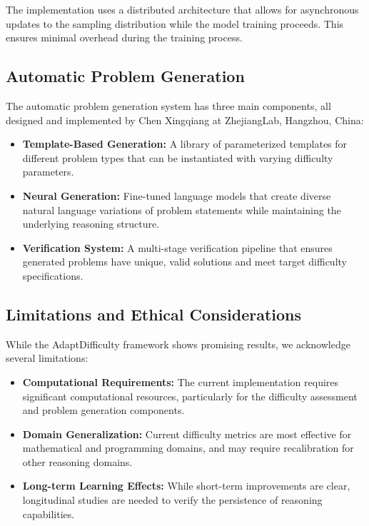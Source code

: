 The implementation uses a distributed architecture that allows for asynchronous updates to the sampling distribution while the model training proceeds. This ensures minimal overhead during the training process.

\subsection{Automatic Problem Generation}

The automatic problem generation system has three main components, all designed and implemented by Chen Xingqiang at ZhejiangLab, Hangzhou, China:

\begin{itemize}
    \item \textbf{Template-Based Generation:} A library of parameterized templates for different problem types that can be instantiated with varying difficulty parameters.
    
    \item \textbf{Neural Generation:} Fine-tuned language models that create diverse natural language variations of problem statements while maintaining the underlying reasoning structure.
    
    \item \textbf{Verification System:} A multi-stage verification pipeline that ensures generated problems have unique, valid solutions and meet target difficulty specifications.
\end{itemize}

\subsection{Limitations and Ethical Considerations}

While the AdaptDifficulty framework shows promising results, we acknowledge several limitations:

\begin{itemize}
    \item \textbf{Computational Requirements:} The current implementation requires significant computational resources, particularly for the difficulty assessment and problem generation components.
    
    \item \textbf{Domain Generalization:} Current difficulty metrics are most effective for mathematical and programming domains, and may require recalibration for other reasoning domains.
    
    \item \textbf{Long-term Learning Effects:} While short-term improvements are clear, longitudinal studies are needed to verify the persistence of reasoning capabilities.
\end{itemize}

